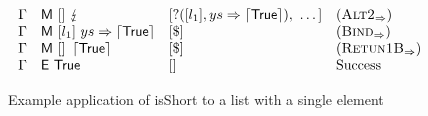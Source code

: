 \begin{figure*}
\[\begin{array}{llll}
            \Gamma      & \textsf{M}~[]~\lightning                                    & [?([l_1],ys \Rightarrow \left\lceil \textsf{True}\right\rceil),~\dots]         & (\textsc{Alt2}_{\Rightarrow})     \\
            \Gamma      & \textsf{M}~[l_1]~ys \Rightarrow \left\lceil \textsf{True}\right\rceil                    & [\$]                                              & (\textsc{Bind}_{\Rightarrow})     \\
            \Gamma      & \textsf{M}~[]~\left\lceil \textsf{True}\right\rceil                                      & [\$]                                              & (\textsc{Retun1B}_{\Rightarrow})  \\
            \Gamma      & \textsf{E}~\textsf{True}                                      & []                                                & \text{Success}         \\
        \end{array}
    \]
    \caption{Example application of \textsf{isShort} to a list with a single element}\label{ex:isShort}
\end{figure*}